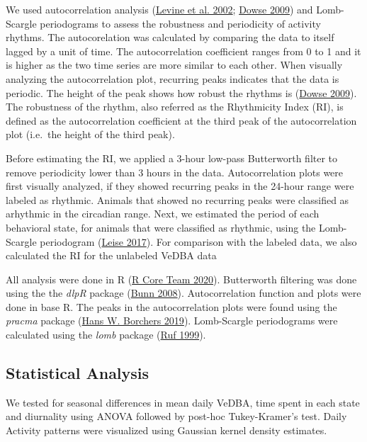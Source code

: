 \documentclass[english,msc,numbers,hidelinks]{coppe}
\begin{document}
  We used autocorrelation analysis (\protect\hyperlink{ref-levine2002}{Levine et al. 2002}; \protect\hyperlink{ref-dowse2009}{Dowse 2009}) and Lomb-Scargle periodograms to assess the robustness and periodicity of activity rhythms. The autocorelation was calculated by comparing the data to itself lagged by a unit of time. The autocorrelation coefficient ranges from 0 to 1 and it is higher as the two time series are more similar to each other. When visually analyzing the autocorrelation plot, recurring peaks indicates that the data is periodic. The height of the peak shows how robust the rhythms is (\protect\hyperlink{ref-dowse2009}{Dowse 2009}). The robustness of the rhythm, also referred as the Rhythmicity Index (RI), is defined as the autocorrelation coefficient at the third peak of the autocorrelation plot (i.e.~the height of the third peak).

  Before estimating the RI, we applied a 3-hour low-pass Butterworth filter to remove periodicity lower than 3 hours in the data. Autocorrelation plots were first visually analyzed, if they showed recurring peaks in the 24-hour range were labeled as rhythmic. Animals that showed no recurring peaks were classified as arhythmic in the circadian range. Next, we estimated the period of each behavioral state, for animals that were classified as rhythmic, using the Lomb-Scargle periodogram (\protect\hyperlink{ref-leise2017}{Leise 2017}). For comparison with the labeled data, we also calculated the RI for the unlabeled VeDBA data

  All analysis were done in R (\protect\hyperlink{ref-rcoreteam2020}{R Core Team 2020}). Butterworth filtering was done using the the \emph{dlpR} package (\protect\hyperlink{ref-bunn2008}{Bunn 2008}). Autocorrelation function and plots were done in base R. The peaks in the autocorrelation plots were found using the \emph{pracma} package (\protect\hyperlink{ref-hansw.borchers2019}{Hans W. Borchers 2019}). Lomb-Scargle periodograms were calculated using the \emph{lomb} package (\protect\hyperlink{ref-ruf1999}{Ruf 1999}).

  \hypertarget{statistical-analysis}{%
  \subsection{Statistical Analysis}\label{statistical-analysis}}

  We tested for seasonal differences in mean daily VeDBA, time spent in each state and diurnality using ANOVA followed by post-hoc Tukey-Kramer's test. Daily Activity patterns were visualized using Gaussian kernel density estimates.
\end{document}
